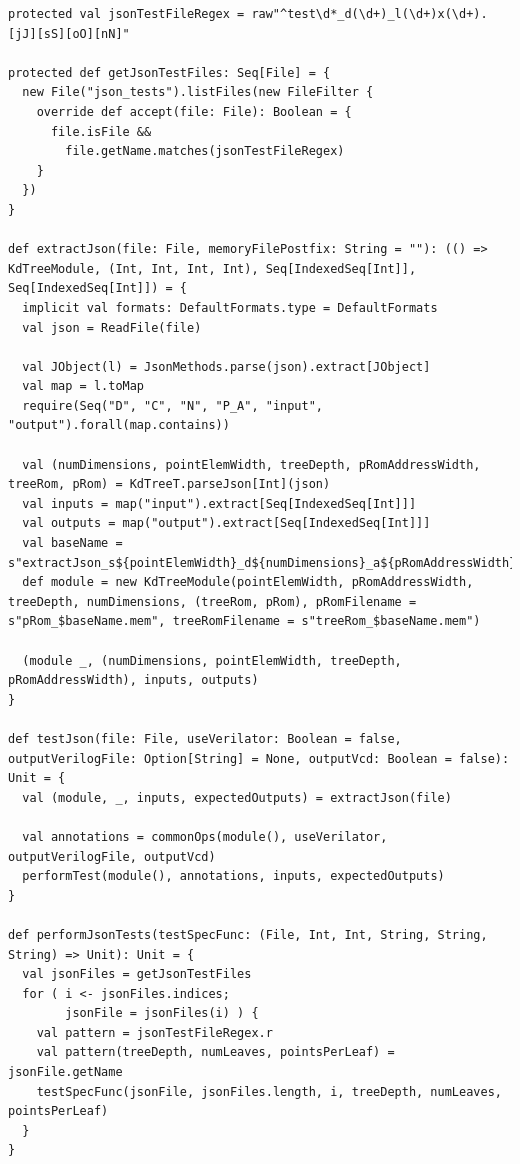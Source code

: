 \documentclass[master]{finthesis}
\newcommand*{\prog}[1]{\texttt{#1}}
\begin{document}
\begin{lstlisting}[style=Chisel, caption={Реализација помоћних функција својства \prog{KdTreeModuleTestSpec} за обраду JSON датотека које садрже спецификације тестова.}, label={lst:testspec:json}]
protected val jsonTestFileRegex = raw"^test\d*_d(\d+)_l(\d+)x(\d+).[jJ][sS][oO][nN]"

protected def getJsonTestFiles: Seq[File] = {
  new File("json_tests").listFiles(new FileFilter {
    override def accept(file: File): Boolean = {
      file.isFile &&
        file.getName.matches(jsonTestFileRegex)
    }
  })
}

def extractJson(file: File, memoryFilePostfix: String = ""): (() => KdTreeModule, (Int, Int, Int, Int), Seq[IndexedSeq[Int]], Seq[IndexedSeq[Int]]) = {
  implicit val formats: DefaultFormats.type = DefaultFormats
  val json = ReadFile(file)

  val JObject(l) = JsonMethods.parse(json).extract[JObject]
  val map = l.toMap
  require(Seq("D", "C", "N", "P_A", "input", "output").forall(map.contains))

  val (numDimensions, pointElemWidth, treeDepth, pRomAddressWidth, treeRom, pRom) = KdTreeT.parseJson[Int](json)
  val inputs = map("input").extract[Seq[IndexedSeq[Int]]]
  val outputs = map("output").extract[Seq[IndexedSeq[Int]]]
  val baseName = s"extractJson_s${pointElemWidth}_d${numDimensions}_a${pRomAddressWidth}_dd${treeDepth}_i${inputs.length}_o${outputs.length}_p${pRom.length}_t${treeRom.length}_${memoryFilePostfix}"
  def module = new KdTreeModule(pointElemWidth, pRomAddressWidth, treeDepth, numDimensions, (treeRom, pRom), pRomFilename = s"pRom_$baseName.mem", treeRomFilename = s"treeRom_$baseName.mem")

  (module _, (numDimensions, pointElemWidth, treeDepth, pRomAddressWidth), inputs, outputs)
}

def testJson(file: File, useVerilator: Boolean = false, outputVerilogFile: Option[String] = None, outputVcd: Boolean = false): Unit = {
  val (module, _, inputs, expectedOutputs) = extractJson(file)

  val annotations = commonOps(module(), useVerilator, outputVerilogFile, outputVcd)
  performTest(module(), annotations, inputs, expectedOutputs)
}

def performJsonTests(testSpecFunc: (File, Int, Int, String, String, String) => Unit): Unit = {
  val jsonFiles = getJsonTestFiles
  for ( i <- jsonFiles.indices;
        jsonFile = jsonFiles(i) ) {
    val pattern = jsonTestFileRegex.r
    val pattern(treeDepth, numLeaves, pointsPerLeaf) = jsonFile.getName
    testSpecFunc(jsonFile, jsonFiles.length, i, treeDepth, numLeaves, pointsPerLeaf)
  }
}
\end{lstlisting}
\end{document}
